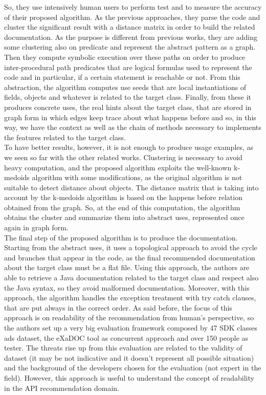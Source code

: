 So, they use intensively human users to perform test and to measure the accuracy of their proposed algorithm. As the previous approaches, they parse the code and cluster the significant result with a distance matrix in order to build the related documentation. As the purpose is different from previous works, they are adding some clustering also on predicate and represent the abstract pattern as a graph. Then they compute symbolic execution over these paths on order to produce inter-procedural path predicates that are logical formulas used to represent the code and in particular, if a certain statement is reachable or not. From this abstraction, the algorithm computes use seeds that are local instantiations of fields, objects and whatever is related to the target class. Finally, from these it produces concrete uses, the real hints about the target class, that are stored in graph form in which edges keep trace about what happens before and so, in this way, we have the context as well as the chain of methods necessary to implements the features related to the target class. \\
To have better results, however, it is not enough to produce usage examples, as we seen so far with the other related works. Clustering is necessary to avoid heavy computation, and the proposed algorithm exploits the well-known k-medoids algorithm with some modifications, as the original algorithm is not suitable to detect distance about objects. The distance matrix that is taking into account by the k-medoids algorithm is based on the happens before relation obtained from the graph. So, at the end of this computation, the algorithm obtains the cluster and summarize them into abstract uses, represented once again in graph form. \\
The final step of the proposed algorithm is to produce the documentation. Starting from the abstract uses, it uses a topological approach to avoid the cycle and branches that appear in the code, as the final recommended documentation about the target class must be a flat file. Using this approach, the authors are able to retrieve a Java documentation related to the target class and respect also the Java syntax, so they avoid malformed documentation. Moreover, with this approach, the algorithm handles the exception treatment with try catch clauses, that are put always in the correct order. As said before, the focus of this approach is on readability of the recommendation from human's perspective, so the authors set up a very big evaluation framework composed by 47 SDK classes ads dataset, the eXaDOC tool as concurrent approach and over 150 people as tester. The threats rise up from this evaluation are related to the validity of dataset (it may be not indicative and it doesn't represent all possible situation) and the background of the developers chosen for the evaluation (not expert in the field). However, this approach is useful to understand the concept of readability in the API recommendation domain.

